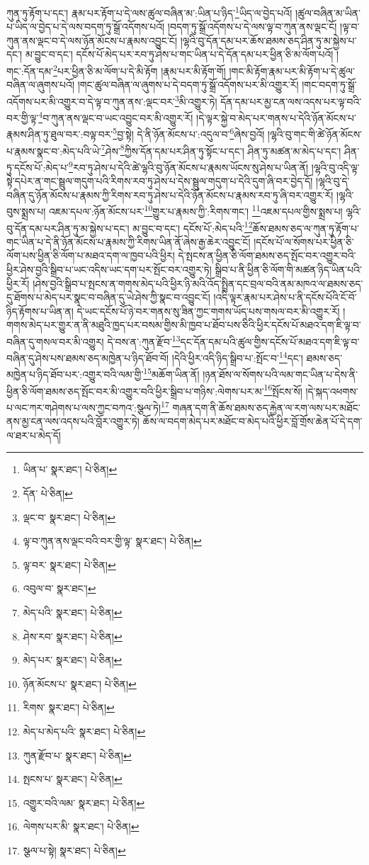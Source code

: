 ཀུན་ཏུ་རྟོག་པ་དང་། རྣམ་པར་རྟོག་པ་དེ་ལས་ཚུལ་བཞིན་མ་:ཡིན་པ་ཉིད་\footnote{ཡིན་པ་  སྣར་ཐང་།  པེ་ཅིན། }ཡིད་ལ་བྱེད་པའོ། །ཚུལ་བཞིན་མ་ཡིན་པ་ཡིད་ལ་བྱེད་པ་དེ་ལས་བདག་ཏུ་སྒྲོ་འདོགས་པའོ། །བདག་ཏུ་སྒྲོ་འདོགས་པ་དེ་ལས་ལྟ་བ་ཀུན་ནས་ལྡང་ངོ། །ལྟ་བ་ཀུན་ནས་ལྡང་བ་དེ་ལས་ཉོན་མོངས་པ་རྣམས་འབྱུང་ངོ། །ལྷའི་བུ་དོན་དམ་པར་ཆོས་ཐམས་ཅད་ཤིན་ཏུ་མ་སྐྱེས་པ་དང་། མ་བྱུང་བ་དང་། དངོས་པོ་མེད་པར་རབ་ཏུ་ཤེས་པ་གང་ཡིན་པ་དེ་དོན་དམ་པར་ཕྱིན་ཅི་མ་ལོག་པའོ། །གང་:དོན་དམ་\footnote{དོན་  པེ་ཅིན། }པར་ཕྱིན་ཅི་མ་ལོག་པ་དེ་མི་རྟོག །རྣམ་པར་མི་རྟོག་གོ། །གང་མི་རྟོག་རྣམ་པར་མི་རྟོག་པ་དེ་ཚུལ་བཞིན་ལ་ཞུགས་པའོ། །གང་ཚུལ་བཞིན་ལ་ཞུགས་པ་དེ་བདག་ཏུ་སྒྲོ་འདོགས་པར་མི་འགྱུར་རོ། །གང་བདག་ཏུ་སྒྲོ་འདོགས་པར་མི་འགྱུར་བ་དེ་ལྟ་བ་ཀུན་ནས་:ལྡང་བར་\footnote{ལྡང་བ་  སྣར་ཐང་།  པེ་ཅིན། }མི་འགྱུར་ཏེ། དོན་དམ་པར་མྱ་ངན་ལས་འདས་པར་ལྟ་བའི་བར་གྱི་ལྟ་\footnote{ལྟ་བ་ཀུན་ནས་ལྡང་བའི་བར་གྱི་ལྟ་  སྣར་ཐང་།  པེ་ཅིན། }བ་ཀུན་ནས་ལྡང་བ་ཡང་འབྱུང་བར་མི་འགྱུར་རོ། །དེ་ལྟར་སྐྱེ་བ་མེད་པར་གནས་པ་དེའི་ཉོན་མོངས་པ་རྣམས་ཤིན་ཏུ་ཐུལ་བར་:བལྟ་བར་\footnote{ལྟ་བར་  སྣར་ཐང་།  པེ་ཅིན། }བྱ་སྟེ། དེ་ནི་ཉོན་མོངས་པ་:འདུལ་བ་\footnote{འབུལ་བ་  སྣར་ཐང་། }ཞེས་བྱའོ། །ལྷའི་བུ་གང་གི་ཚེ་ཉོན་མོངས་པ་རྣམས་སྣང་བ་:མེད་པའི་ཡེ་\footnote{མེད་པའི་  སྣར་ཐང་།  པེ་ཅིན། }ཤེས་\footnote{ཤེས་རབ་  སྣར་ཐང་།  པེ་ཅིན། }ཀྱིས་དོན་དམ་པར་ཤིན་ཏུ་སྟོང་པ་དང་། ཤིན་ཏུ་མཚན་མ་མེད་པ་དང་། ཤིན་ཏུ་དངོས་པོ་:མེད་པ་\footnote{མེད་པར་  སྣར་ཐང་།  པེ་ཅིན། }རབ་ཏུ་ཤེས་པ་དེའི་ཚེ་ལྷའི་བུ་ཉོན་མོངས་པ་རྣམས་ཡོངས་སུ་ཤེས་པ་ཡིན་ནོ། །ལྷའི་བུ་འདི་ལྟ་སྟེ་དཔེར་ན་གང་སྦྲུལ་གདུག་པའི་རིགས་རབ་ཏུ་ཤེས་པ་དེས་སྦྲུལ་གདུག་པ་དེའི་དུག་ཞི་བར་བྱེད་དོ། །ལྷའི་བུ་དེ་བཞིན་དུ་ཉོན་མོངས་པ་རྣམས་ཀྱི་རིགས་རབ་ཏུ་ཤེས་པ་དེའི་ཉོན་མོངས་པ་རྣམས་རབ་ཏུ་ཞི་བར་འགྱུར་རོ། །ལྷའི་བུས་སྨྲས་པ། འཇམ་དཔལ་:ཉོན་མོངས་པར་\footnote{ཉོན་མོངས་པ་  སྣར་ཐང་།  པེ་ཅིན། }གྱུར་པ་རྣམས་ཀྱི་:རིགས་གང་། \footnote{རིགས་  སྣར་ཐང་།  པེ་ཅིན། }འཇམ་དཔལ་གྱིས་སྨྲས་པ། ལྷའི་བུ་དོན་དམ་པར་ཤིན་ཏུ་མ་སྐྱེས་པ་དང་། མ་བྱུང་བ་དང་། དངོས་པོ་:མེད་པའི་\footnote{མེད་པ་མེད་པའི་  སྣར་ཐང་།  པེ་ཅིན། }ཆོས་ཐམས་ཅད་ལ་ཀུན་ཏུ་རྟོག་པ་གང་ཡིན་པ་དེ་ནི་ཉོན་མོངས་པ་རྣམས་ཀྱི་རིགས་ཡིན་ནོ་ཞེས་རྒྱ་ཆེར་འབྱུང་ངོ། །དངོས་པོ་ལ་སོགས་པར་ཕྱིན་ཅི་ལོག་པས་ཕྱིན་ཅི་ལོག་པ་མཐའ་དག་ལ་ཁྱབ་པའི་ཕྱིར། དེ་སྤངས་ན་ཕྱིན་ཅི་ལོག་ཐམས་ཅད་སྤོང་བར་འགྱུར་བའི་ཕྱིར་ཤེས་བྱའི་སྒྲིབ་པ་ཡང་འདིས་ཡང་དག་པར་སྤོང་བར་འགྱུར་ཏེ། སྒྲིབ་པ་ནི་ཕྱིན་ཅི་ལོག་གི་མཚན་ཉིད་ཡིན་པའི་ཕྱིར་རོ། །ཤེས་བྱའི་སྒྲིབ་པ་སྤངས་ན་གགས་མེད་པའི་ཕྱིར་ཉི་མའི་འོད་སྤྲིན་དང་བྲལ་བའི་ནམ་མཁའ་ལ་ཐམས་ཅད་དུ་ཐོགས་པ་མེད་པར་སྣང་བ་བཞིན་དུ་ཡེ་ཤེས་ཀྱི་སྣང་བ་འབྱུང་ངོ། །འདི་ལྟར་རྣམ་པར་ཤེས་པ་ནི་དངོས་པོའི་ངོ་བོ་ཉིད་རྟོགས་པ་ཡིན་ན། དེ་ཡང་དངོས་པོ་ཉེ་བར་གནས་སུ་ཟིན་ཀྱང་གགས་ཡོད་པས་གསལ་བར་མི་འགྱུར་རོ། །གགས་མེད་པར་གྱུར་ན་ནི་མཐུའི་ཁྱད་པར་བསམ་གྱིས་མི་ཁྱབ་པ་ཐོབ་པས་ཅིའི་ཕྱིར་དངོས་པོ་མཐའ་དག་ཇི་ལྟ་བ་བཞིན་དུ་གསལ་བར་མི་འགྱུར། དེ་བས་ན་:ཀུན་རྫོབ་\footnote{ཀུན་རྫོབ་པ་  སྣར་ཐང་།  པེ་ཅིན། }དང་དོན་དམ་པའི་ཚུལ་གྱིས་དངོས་པོ་མཐའ་དག་ཇི་ལྟ་བ་བཞིན་དུ་ཤེས་པས་ཐམས་ཅད་མཁྱེན་པ་ཉིད་ཐོབ་བོ། །དེའི་ཕྱིར་འདི་ཉིད་སྒྲིབ་པ་:སྤོང་བ་\footnote{སྤངས་པ་  སྣར་ཐང་།  པེ་ཅིན། }དང་། ཐམས་ཅད་མཁྱེན་པ་ཉིད་ཐོབ་པར་:འགྱུར་བའི་ལམ་གྱི་\footnote{འགྱུར་བའི་ལམ་  སྣར་ཐང་།  པེ་ཅིན། }མཆོག་ཡིན་ནོ། །ཉན་ཐོས་ལ་སོགས་པའི་ལམ་གང་ཡིན་པ་དེས་ནི་ཕྱིན་ཅི་ལོག་ཐམས་ཅད་སྤོང་བར་མི་འགྱུར་བའི་ཕྱིར་སྒྲིབ་པ་གཉིས་:ལེགས་པར་མ་\footnote{ལེགས་པར་མི་  སྣར་ཐང་།  པེ་ཅིན། }སྤོངས་སོ། །དེ་སྐད་འཕགས་པ་ལང་ཀར་གཤེགས་པ་ལས་ཀྱང་བཀའ་:སྩལ་ཏེ།\footnote{སྩལ་པ་སྟེ།  སྣར་ཐང་།  པེ་ཅིན། } གཞན་དག་ནི་ཆོས་ཐམས་ཅད་རྐྱེན་ལ་རག་ལས་པར་མཐོང་ནས་མྱ་ངན་ལས་འདས་པའི་བློར་འགྱུར་ཏེ། ཆོས་ལ་བདག་མེད་པར་མཐོང་བ་མེད་པའི་ཕྱིར་བློ་གྲོས་ཆེན་པོ་དེ་དག་ལ་ཐར་པ་མེད་དོ། 